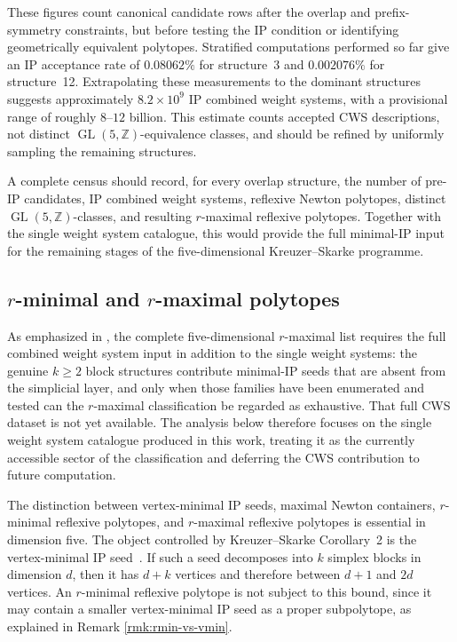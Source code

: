 \documentclass[appliedmath,article,submit,moreauthors]{Definitions/mdpi}
\newcommand{\GL}{\operatorname{GL}}
\begin{document}
 These figures count canonical candidate rows after the overlap and
 prefix-symmetry constraints, but before testing the IP condition or identifying
 geometrically equivalent polytopes. Stratified computations performed so far
 give an IP acceptance rate of $0.08062\%$ for structure~3 and $0.002076\%$ for
 structure~12. Extrapolating these measurements to the dominant structures
 suggests approximately $8.2\times10^9$ IP combined weight systems, with a
 provisional range of roughly $8$--$12$ billion. This estimate counts accepted
 CWS descriptions, not distinct $\GL(5,\mathbb Z)$-equivalence classes, and
 should be refined by uniformly sampling the remaining structures.
 
 A complete census should record, for every overlap structure, the number of
 pre-IP candidates, IP combined weight systems, reflexive Newton polytopes,
 distinct $\GL(5,\mathbb Z)$-classes, and resulting $r$-maximal reflexive
 polytopes. Together with the single weight system catalogue, this would provide
 the full minimal-IP input for the remaining stages of the five-dimensional
 Kreuzer--Skarke programme.

\subsection{\texorpdfstring{\(r\)-minimal}{r-minimal} and \texorpdfstring{\(r\)-maximal}{r-maximal} polytopes}
\label{sec:discussion-rmaximal}

As emphasized in , the complete
five-dimensional \(r\)-maximal list requires the full combined weight system
input in addition to the single weight systems: the genuine \(k\geq2\) block
structures contribute minimal-IP seeds that are absent from the simplicial
layer, and only when those families have been enumerated and tested can the
\(r\)-maximal classification be regarded as exhaustive. That full CWS dataset is
not yet available. The analysis below therefore focuses on the
single weight system catalogue produced in this work, treating it as the
currently accessible sector of the classification and deferring the CWS
contribution to future computation.

The distinction between vertex-minimal IP seeds, maximal Newton containers,
\(r\)-minimal reflexive polytopes, and \(r\)-maximal reflexive polytopes is
essential in dimension five. The object controlled by Kreuzer--Skarke
Corollary~2 is the vertex-minimal IP seed~\cite{KS97}. If such a seed decomposes
into \(k\) simplex blocks in dimension \(d\), then it has \(d+k\) vertices and
therefore between \(d+1\) and \(2d\) vertices. An \(r\)-minimal reflexive
polytope is not subject to this bound, since it may contain a smaller
vertex-minimal IP seed as a proper subpolytope, as explained in
Remark \ref{rmk:rmin-vs-vmin}.
\end{document}
